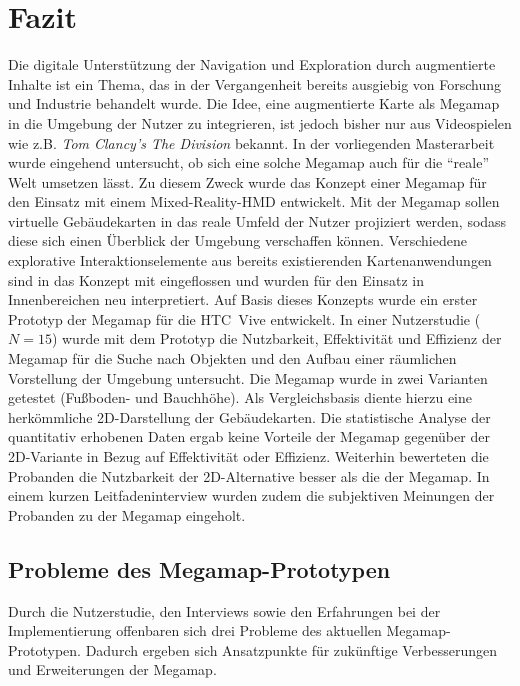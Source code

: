 \chapter{Fazit}
\label{chap:closing}
Die digitale Unterstützung der Navigation und Exploration durch augmentierte Inhalte ist ein Thema, das in der Vergangenheit bereits ausgiebig von Forschung und Industrie behandelt wurde.
Die Idee, eine augmentierte Karte als Megamap in die Umgebung der Nutzer zu integrieren, ist jedoch bisher nur aus Videospielen wie z.B. \emph{Tom Clancy's The Division} bekannt.
In der vorliegenden Masterarbeit wurde eingehend untersucht, ob sich eine solche Megamap auch für die \enquote{reale} Welt umsetzen lässt.
Zu diesem Zweck wurde das Konzept einer Megamap für den Einsatz mit einem Mixed-Reality-HMD entwickelt.
Mit der Megamap sollen virtuelle Gebäudekarten in das reale Umfeld der Nutzer projiziert werden, sodass diese sich einen Überblick der Umgebung verschaffen können.
Verschiedene explorative Interaktionselemente aus bereits existierenden Kartenanwendungen sind in das Konzept mit eingeflossen und wurden für den Einsatz in Innenbereichen neu interpretiert.
Auf Basis dieses Konzepts wurde ein erster Prototyp der Megamap für die HTC~Vive entwickelt.
In einer Nutzerstudie ($N=15$) wurde mit dem Prototyp die Nutzbarkeit, Effektivität und Effizienz der Megamap für die Suche nach Objekten und den Aufbau einer räumlichen Vorstellung der Umgebung untersucht.
Die Megamap wurde in zwei Varianten getestet (Fußboden- und Bauchhöhe).
Als Vergleichsbasis diente hierzu eine herkömmliche 2D-Darstellung der Gebäudekarten.
Die statistische Analyse der quantitativ erhobenen Daten ergab keine Vorteile der Megamap gegenüber der 2D-Variante in Bezug auf Effektivität oder Effizienz.
Weiterhin bewerteten die Probanden die Nutzbarkeit der 2D-Alternative besser als die der Megamap.
In einem kurzen Leitfadeninterview wurden zudem die subjektiven Meinungen der Probanden zu der Megamap eingeholt.

\section{Probleme des Megamap-Prototypen}
Durch die Nutzerstudie, den Interviews sowie den Erfahrungen bei der Implementierung offenbaren sich drei Probleme des aktuellen Megamap-Prototypen.
Dadurch ergeben sich Ansatzpunkte für zukünftige Verbesserungen und Erweiterungen der Megamap.

